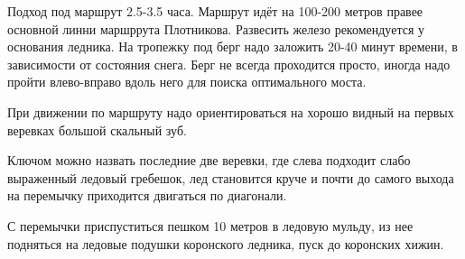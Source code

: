 Подход под маршрут 2.5-3.5 часа. Маршрут идёт на 100-200 метров правее
основной линни маршррута Плотникова. Развесить железо рекомендуется у
основания ледника. На тропежку под берг надо заложить 20-40 минут
времени, в зависимости от состояния снега. Берг не всегда проходится
просто, иногда надо пройти влево-вправо вдоль него для поиска
оптимального моста.

При движении по маршруту надо ориентироваться на хорошо видный на
первых веревках большой скальный зуб.

Ключом можно назвать последние две веревки, где слева подходит слабо
выраженный ледовый гребешок, лед становится круче и почти до самого
выхода на перемычку приходится двигаться по диагонали.

С перемычки приспуститься пешком 10 метров в ледовую мульду, из нее
подняться на ледовые подушки коронского ледника, пуск до коронских
хижин.
